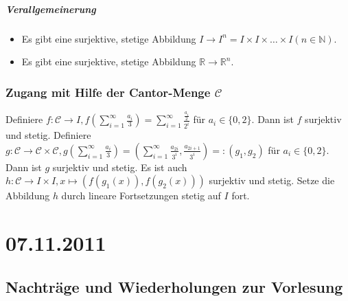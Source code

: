 \documentclass[a4paper,11pt,notitlepage]{report}
\theoremstyle{definition}
\newcommand{\R}{{\ensuremath{\mathbb{R}}}}
\newcommand{\N}{{\ensuremath{\mathbb{N}}}}
\begin{document}
\paragraph{Verallgemeinerung}
\begin{itemize}
\item Es gibt eine surjektive, stetige Abbildung $I \rightarrow I^n = I \times I \times \ldots \times I (n \in \N)$.
\item Es gibt eine surjektive, stetige Abbildung $\R \rightarrow \R^n$.
\end{itemize}

\subsection{Zugang mit Hilfe der Cantor-Menge $\mathcal{C}$}
Definiere $f \colon \mathcal{C} \rightarrow I, f \left(\sum\limits_{i=1}^{\infty}{\frac{a_i}{3}} \right) = \sum\limits_{i=1}^{\infty}{\frac{\frac{a_i}{2}}{2^i}}$ für $a_i \in \{0,2\}$.
\newline
Dann ist $f$ surjektiv und stetig.
\newline
Definiere $g \colon \mathcal{C} \rightarrow \mathcal{C} \times \mathcal{C}, g \left(\sum\limits_{i=1}^{\infty}{\frac{a_i}{3}} \right) = \left(\sum\limits_{i=1}^{\infty}{\frac{a_{2i}}{3^i}}, \frac{a_{2i+1}}{3^i} \right)=:(g_1,g_2)$ für $a_i \in \{0,2\}$.
\newline
Dann ist $g$ surjektiv und stetig.
\newline
Es ist auch $h \colon \mathcal{C} \rightarrow I \times I, x \mapsto \left(f(g_1(x)), f(g_2(x))\right)$ surjektiv und stetig.
\newline
Setze die Abbildung $h$ durch lineare Fortsetzungen stetig auf $I$ fort.

\chapter{07.11.2011}
\section{Nachträge und Wiederholungen zur Vorlesung}
\end{document}
